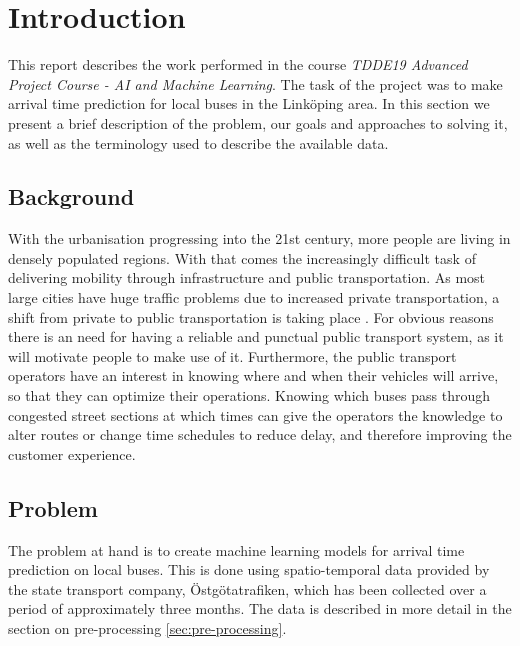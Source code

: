 


\chapter{Introduction}
\label{cha:introduction}
This report describes the work performed in the course \textit{TDDE19 Advanced Project Course - AI and Machine Learning}. The task of the project was to make arrival time prediction for local buses in the Link\"oping area. In this section we present a brief description of the problem, our goals and approaches to solving it, as well as the terminology used to describe the available data.

\section{Background}
With the urbanisation progressing into the 21st century, more people are living in densely populated regions. With that comes the increasingly difficult task of delivering mobility through infrastructure and public transportation. As most large cities have huge traffic problems due to increased private transportation, a shift from private to public transportation is taking place \cite{kotter2004risks}. For obvious reasons there is an need for having a reliable and punctual public transport system, as it will motivate people to make use of it. Furthermore, the public transport operators have an interest in knowing where and when their vehicles will arrive, so that they can optimize their operations. Knowing which buses pass through congested street sections at which times can give the operators the knowledge to alter routes or change time schedules to reduce delay, and therefore improving the customer experience.

\section{Problem}
\label{sec:problem}
The problem at hand is to create machine learning models for arrival time prediction on local buses. This is done using spatio-temporal data provided by the state transport company, \"Ostg\"otatrafiken, which has been collected over a period of approximately three months. The data is described in more detail in the section on pre-processing \ref{sec:pre-processing}.

